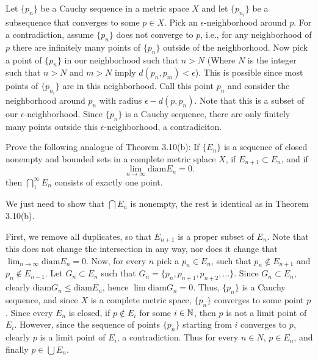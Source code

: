 \begin{solution}
  Let $\{p_n\}$ be a Cauchy sequence in a metric space $X$ and let $\{p_{n_i}\}$ be a subsequence that converges to some $p \in X$.
  Pick an $\epsilon$-neighborhood around $p$.
  For a contradiction, assume $\{p_n\}$ does not converge to $p$, i.e., for any neighborhood of $p$ there are infinitely many points of $\{p_n\}$ outside of the neighborhood.
  Now pick a point of $\{p_{n}\}$ in our neighborhood such that $n > N$ (Where $N$ is the integer such that $n > N$ and $m > N$ imply $d(p_n, p_m) < \epsilon$).
  This is possible since most points of $\{p_{n_i}\}$ are in this neighborhood.
  Call this point $p_n$ and consider the neighborhood around $p_n$ with radius $\epsilon - d(p, p_n)$.
  Note that this is a subset of our $\epsilon$-neighborhood.
  Since $\{p_n\}$ is a Cauchy sequence, there are only finitely many points outside this $\epsilon$-neighborhood, a contradiciton.
\end{solution}

\begin{problem}
  Prove the following analogue of Theorem 3.10(b): If $\{E_n\}$ is a sequence of closed nonempty and bounded sets in a complete metric splace $X$, if $E_{n+1} \subset E_n$, and if 
  \[\lim_{n \to \infty} \text{diam} E_n = 0.\]
  then $\bigcap_1^{\infty} E_n$ consists of exactly one point.
\end{problem}

\begin{solution}
  We just need to show that $\bigcap E_n$ is nonempty, the rest is identical as in Theorem 3.10(b).

  First, we remove all duplicates, so that $E_{n + 1}$ is a proper subset of $E_n$.
  Note that this does not change the intersection in any way, nor does it change that $\lim_{n \to \infty} \text{diam} E_n = 0$.
  Now, for every $n$ pick a $p_n \in E_n$, such that $p_n \notin E_{n + 1}$ and $p_n \notin E_{n - 1}$.
  Let $G_n \subset E_n$ such that $G_n = \{p_n, p_{n + 1}, p_{n + 2}, \ldots\}$.
  Since $G_n \subset E_n$, clearly $\text{diam} G_n \le \text{diam} E_n$, hence $\lim \text{diam} G_n = 0$.
  Thus, $\{p_n\}$ is a Cauchy sequence, and since $X$ is a complete metric space, $\{p_n\}$ converges to some point $p$.
  Since every $E_n$ is closed, if $p \notin E_i$ for some $i \in \mathbb{N}$, then $p$ is not a limit point of $E_i$.
  However, since the sequence of points $\{p_n\}$ starting from $i$ converges to $p$, clearly $p$ is a limit point of $E_i$, a contradiction.
  Thus for every $n \in N$, $p \in E_n$, and finally $p \in \bigcup E_n$.
\end{solution}

